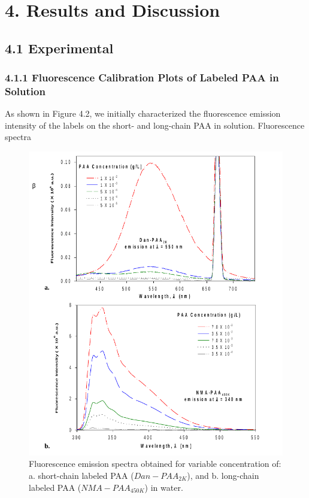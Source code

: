 \documentclass[journal=mamobx,manuscript=article]{achemso}
\begin{document}

\section{4. Results and Discussion}

\subsection{4.1 Experimental}

\subsubsection{4.1.1 Fluorescence Calibration Plots of Labeled PAA in Solution}

As shown in Figure 4.2, we initially characterized the fluorescence emission intensity of the labels on the short- and long-chain PAA in solution.  Fluorescence spectra

\begin{figure}[H]
\includegraphics[scale=0.5]{fig2.png}
\caption{Fluorescence emission spectra obtained for variable concentration of: a. short-chain labeled PAA ($Dan-PAA_{2K}$), and b. long-chain labeled PAA ($NMA-PAA_{450K}$) in water.}
\label{figure 2}
\end{figure}
\end{document}
